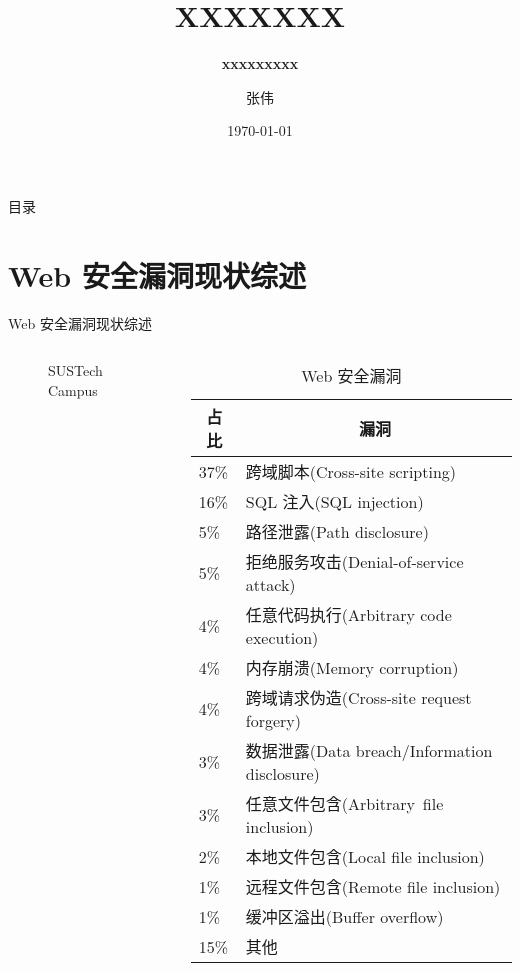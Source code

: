 \documentclass[UTF8,10pt,aspectratio=43]{ctexbeamer}
\title{XXXXXXX}
\subtitle{\fontsize{9pt}{14pt}\textbf{xxxxxxxxx}}
\author{张伟}
\institute{华中科技大学}
\date{\today}
\begin{document}

\frame{\titlepage}

\section[目录]{}   %
\begin{frame}{目录}
\tableofcontents
\end{frame}

\section{Web 安全漏洞现状综述}
\begin{frame}{Web 安全漏洞现状综述}
\begin{columns}[T] %
  \begin{column}{.40\textwidth}
	  \begin{figure}[thpb]
		  \centering
		  \resizebox{1\linewidth}{!}{
		  }
		  \caption{SUSTech Campus~\cite{DBLP:conf/osdi/AbadiBCCDDDGIIK16}}
		  \label{fig:campus}
	  \end{figure}
  \end{column}
  
  \hfill

  \begin{column}{.65\textwidth}
    \begin{table}[htbp]
      \caption{Web 安全漏洞}
      \label{tab:rank}
      \centering
			\footnotesize
      \begin{tabular}[c]{l|l}
        \hline
        \multicolumn{1}{c|}{\textbf{占比}} & 
        \multicolumn{1}{c}{\textbf{漏洞}} \\
        \hline
	      37\% & 跨域脚本(Cross-site scripting) \\
	      16\% & SQL 注入(SQL injection) \\
	      5\% & 路径泄露(Path disclosure) \\
	      5\% & 拒绝服务攻击(Denial-of-service attack) \\
	      4\% & 任意代码执行(Arbitrary code execution) \\
        4\% & 内存崩溃(Memory corruption) \\
	      4\% & 跨域请求伪造(Cross-site request forgery) \\
	      3\% & 数据泄露(Data breach/Information disclosure) \\
	      3\% & 任意文件包含(Arbitrary file inclusion) \\
	      2\% & 本地文件包含(Local file inclusion) \\
	      1\% & 远程文件包含(Remote file inclusion) \\
	      1\% & 缓冲区溢出(Buffer overflow) \\
        15\% & 其他 \\
        \hline
      \end{tabular}
    \end{table}
  \end{column}
\end{columns}
\end{frame}
\end{document}
